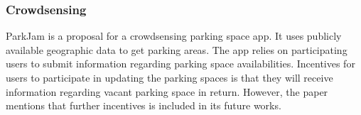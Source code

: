 \subsubsection*{Crowdsensing}
ParkJam \citep{Kopeck2012PARKJAM:Demo} is a proposal for a crowdsensing parking space app. It uses publicly available geographic data to get parking areas. The app relies on participating users to submit information regarding parking space availabilities. Incentives for users to participate in updating the parking spaces is that they will receive information regarding vacant parking space in return. However, the paper mentions that further incentives is included in its future works.